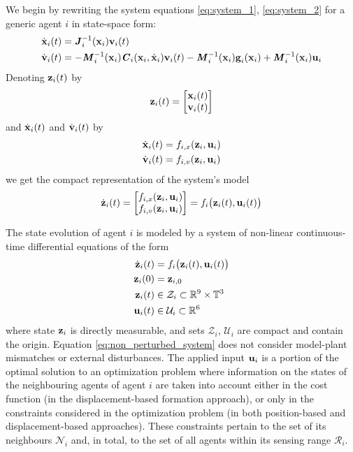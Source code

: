 We begin by rewriting the system equations \eqref{eq:system_1},
\eqref{eq:system_2} for a generic agent $i$ in state-space form:
\begin{align}
  \dot{\bm{\mathbf{x}}}_i(t) &= \bm{\mathit{J}}_i^{-1}(\bm{\mathbf{x}}_i) \bm{\mathbf{v}}_i(t) \\
  \dot{\bm{\mathbf{v}}}_i(t) &= -\bm{\mathit{M}}_i^{-1}(\bm{\mathbf{x}}_i)\bm{\mathit{C}}_i(\bm{\mathbf{x}}_i,\dot{\bm{\mathbf{x}}}_i) \bm{\mathbf{v}}_i(t)
    - \bm{\mathit{M}}_i^{-1}(\bm{\mathbf{x}}_i)\bm{\mathbf{g}}_i(\bm{\mathbf{x}}_i)
    + \bm{\mathit{M}}_i^{-1}(\bm{\mathbf{x}}_i)\bm{\mathbf{u}}_i
\label{eq:system}
\end{align}
Denoting $\bm{\mathbf{z}}_i(t)$ by
\begin{align}
  \bm{\mathbf{z}}_i(t) =
    \begin{bmatrix}
      \bm{\mathbf{x}}_i(t) \\
      \bm{\mathbf{v}}_i(t) \\
    \end{bmatrix}
\end{align}
and
$\dot{\bm{\mathbf{x}}}_i(t)$ and $\dot{\bm{\mathbf{v}}}_i(t)$ by
\begin{align}
  \dot{\bm{\mathbf{x}}}_i(t) &= f_{i,x}(\bm{\mathbf{z}}_i, \bm{\mathbf{u}}_i) \\
  \dot{\bm{\mathbf{v}}}_i(t) &= f_{i,v}(\bm{\mathbf{z}}_i, \bm{\mathbf{u}}_i)
\end{align}
we get the compact representation of the system's model
\begin{align}
  \dot{\bm{\mathbf{z}}}_i(t) =
    \begin{bmatrix}
      f_{i,x}(\bm{\mathbf{z}}_i, \bm{\mathbf{u}}_i) \\
      f_{i,v}(\bm{\mathbf{z}}_i, \bm{\mathbf{u}}_i) \\
    \end{bmatrix} =
 f_i \big(\bm{\mathbf{z}}_i (t), \bm{\mathbf{u}}_i (t)\big)
\end{align}

The state evolution of agent $i$ is modeled by a system of non-linear
continuous-time differential equations of the form
\begin{align}
  \dot{\bm{\mathbf{z}}}_i(t) &= f_i \big(\bm{\mathbf{z}}_i (t), \bm{\mathbf{u}}_i (t)\big) \label{eq:non_perturbed_system}\\
  \bm{\mathbf{z}}_i(0) &= \bm{\mathbf{z}}_{i,0} \\
  \bm{\mathbf{z}}_i (t) &\in \mathcal{Z}_i \subset \mathbb{R}^{9} \times \mathbb{T}^3 \\
  \bm{\mathbf{u}}_i (t) &\in \mathcal{U}_i \subset \mathbb{R}^6
\end{align}
where state $\bm{\mathbf{z}}_i$ is directly measurable, and sets $\mathcal{Z}_i$,
$\mathcal{U}_i$ are compact and contain the origin. Equation
\ref{eq:non_perturbed_system} does not consider model-plant mismatches or
external disturbances. The applied input $\bm{\mathbf{u}}_i$ is a portion of the
optimal solution to an optimization problem where information on the states
of the neighbouring agents of agent $i$ are taken into account either in the
cost function (in the displacement-based formation approach), or only in the
constraints considered in the optimization problem (in both position-based
and displacement-based approaches). These constraints pertain to the set of
its neighbours $\mathcal{N}_i$ and, in total, to the set of all agents within
its sensing range $\mathcal{R}_i$.

